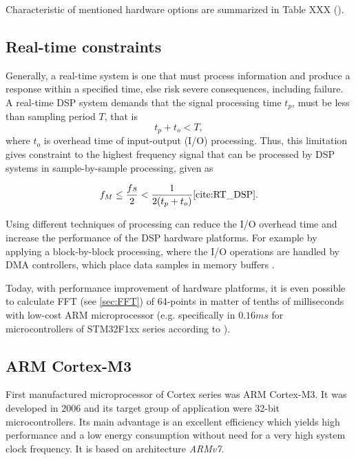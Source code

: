 \documentclass[twoside]{ctuthesis}
\theoremstyle{plain}
\theoremstyle{definition}
\theoremstyle{note}
\begin{document}
Characteristic of mentioned hardware options are summarized in Table XXX (\cite{cite:RT_DSP}).

\subsection{Real-time constraints}
\label{R-T constrains}
Generally, a real-time system is one that must process information and produce a response within a specified time, else risk severe consequences, including failure. A real-time DSP system demands that the signal processing time $t_{p}$, must be less than sampling period $T$, that is
\begin{equation} \label{eq:hardRealTime1}
t_{p}+t_{o}<T,
\end{equation}
where $t_{o}$ is overhead time of input-output (I/O) processing.
Thus, this limitation gives constraint to the highest frequency signal that can be processed by DSP systems in sample-by-sample processing, given as

\begin{equation} \label{eq:hardRealTime2}
f_{M} \leq \frac{fs}{2} < \frac{1}{2(t_{p}+t_{o})} \cite{cite:RT_DSP}.
\end{equation}

Using different techniques of processing can reduce the I/O overhead time and increase the performance of the DSP hardware platforms. For example by applying a block-by-block processing, where the I/O operations are handled by DMA controllers, which place data samples in memory buffers \cite{cite:RT_DSP}.

Today, with performance improvement of hardware platforms, it is even possible to calculate FFT (see \ref{sec:FFT}) of 64-points in matter of tenths of milliseconds with low-cost ARM microprocessor (e.g. specifically in $0.16 ms$ for microcontrollers of STM32F1xx series according to \cite{cite:STM32_DSP_library}).
\subsection{ARM Cortex-M3}
\label{sec:ARM_M3}
First manufactured microprocessor of Cortex series was ARM Cortex-M3. It was developed in 2006 and its target group of application were 32-bit microcontrollers. Its main advantage is an excellent efficiency which yields high performance and a low energy consumption without need for a very high system clock frequency. It is based on architecture \textit{ARMv7}.
\end{document}
